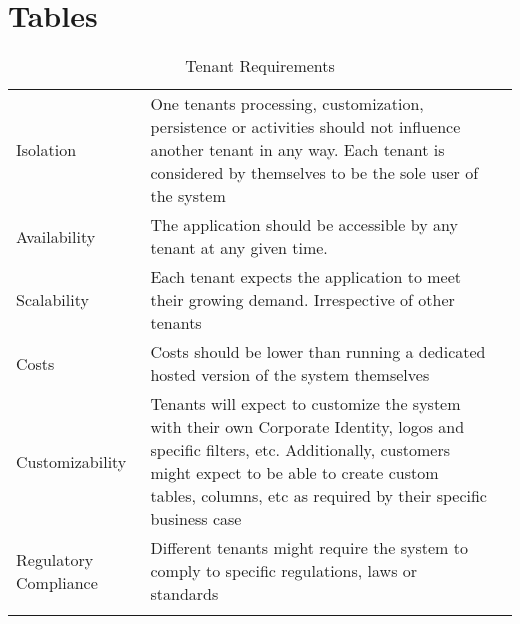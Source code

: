\chapter{Tables}
\label{appendix:tables}


\begin{table}[h]
\centering
\begin{tabularx}{\textwidth}{l X l}
\cline{1-2}
\multicolumn{1}{|l|}{\cellcolor[HTML]{EFEFEF}Isolation} & \multicolumn{1}{X|}{One tenants processing, customization, persistence or activities should not influence another tenant in any way. Each tenant is considered by themselves to be the sole user of the system} &  \\ \cline{1-2}
\multicolumn{1}{|l|}{\cellcolor[HTML]{EFEFEF}Availability} & \multicolumn{1}{X|}{The application should be accessible by any tenant at any given time.} &  \\ \cline{1-2}
\multicolumn{1}{|l|}{\cellcolor[HTML]{EFEFEF}Scalability} & \multicolumn{1}{X|}{Each tenant expects the application to meet their growing demand. Irrespective of other tenants} &  \\ \cline{1-2}
\multicolumn{1}{|l|}{\cellcolor[HTML]{EFEFEF}Costs} & \multicolumn{1}{X|}{Costs should be lower than running a dedicated hosted version of the system themselves} &  \\ \cline{1-2}
\multicolumn{1}{|l|}{\cellcolor[HTML]{EFEFEF}Customizability} & \multicolumn{1}{X|}{Tenants will expect to customize the system with their own Corporate Identity, logos and specific filters, etc. Additionally, customers might expect to be able to create custom tables, columns, etc as required by their specific business case} &  \\ \cline{1-2}
\multicolumn{1}{|l|}{\cellcolor[HTML]{EFEFEF}Regulatory Compliance} & \multicolumn{1}{X|}{Different tenants might require the system to comply to specific regulations, laws or standards} &  \\ \cline{1-2}
 &  & 
\end{tabularx}
\caption{Tenant Requirements}
\label{table:tenant-requirements}
\end{table}


